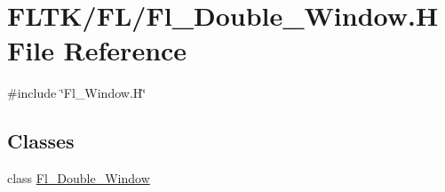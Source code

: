\hypertarget{_fl___double___window_8_h}{}\section{F\+L\+T\+K/\+F\+L/\+Fl\+\_\+\+Double\+\_\+\+Window.H File Reference}
\label{_fl___double___window_8_h}
{\ttfamily \#include \char`\"{}Fl\+\_\+\+Window.\+H\char`\"{}}\newline
\subsection*{Classes}
\begin{DoxyCompactItemize}
\item 
class \hyperlink{class_fl___double___window}{Fl\+\_\+\+Double\+\_\+\+Window}
\end{DoxyCompactItemize}
